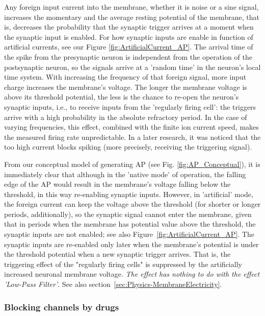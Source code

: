 Any foreign input current into the membrane, whether it is noise or a sine signal,
increases the momentary and the average resting potential of the membrane,
that is, decreases the probability that the synaptic trigger
arrives at a moment when the synaptic input is enabled.
For how synaptic inputs are enable in function of artificial currents, see our Figure \ref{fig:ArtificialCurrent_AP}.
The arrival time of the spike from the presynaptic neuron is independent
from the operation of the postsynaptic neuron, so the signals arrive at a 'random time'
in the neuron's local time system.
With increasing the frequency of that foreign signal,
more input charge increases the membrane's voltage.
The longer the membrane voltage is above its threshold potential,
the less is the chance to re-open the neuron's synaptic inputs, i.e.,
to receive inputs from the 'regularly firing cell':
the triggers arrive with a high probability in the absolute refractory period.
In the case of varying frequencies, this effect, combined with the finite ion current speed, makes the measured firing rate unpredictable. In a later research, it was noticed that \cite{DepolarizationBianchi:2012}
the too high current blocks spiking (more precisely,
receiving the triggering signal).

From our conceptual model of generating \gls{AP}
(see Fig. \ref{fig:AP_Conceptual}),
it is immediately clear that although in the 'native mode' of operation,
the falling edge of the \gls{AP}
would result in the membrane's voltage falling below the threshold,
in this way re-enabling synaptic inputs.
However, in 'artificial' mode, the foreign current can keep the voltage above the threshold
(for shorter or longer periods, additionally),
so the synaptic signal cannot enter the membrane, given that
in periods when the membrane has potential value above the threshold,
the synaptic inputs are not enabled; see also Figure~\ref{fig:ArtificialCurrent_AP}.
The synaptic inputs are re-enabled only  later when the membrane's potential is
under the threshold potential when a new synaptic trigger arrives.
That is, the triggering effect
of the "regularly firing cells" is suppressed by the artificially
increased neuronal membrane voltage.
\textit{The effect has nothing to do with the effect 'Low-Pass Filter'}. See also section~\ref{sec:Physics-MembraneElectricity}.


\subsubsection{Blocking channels by drugs \label{sec:BlockingChannels}}

